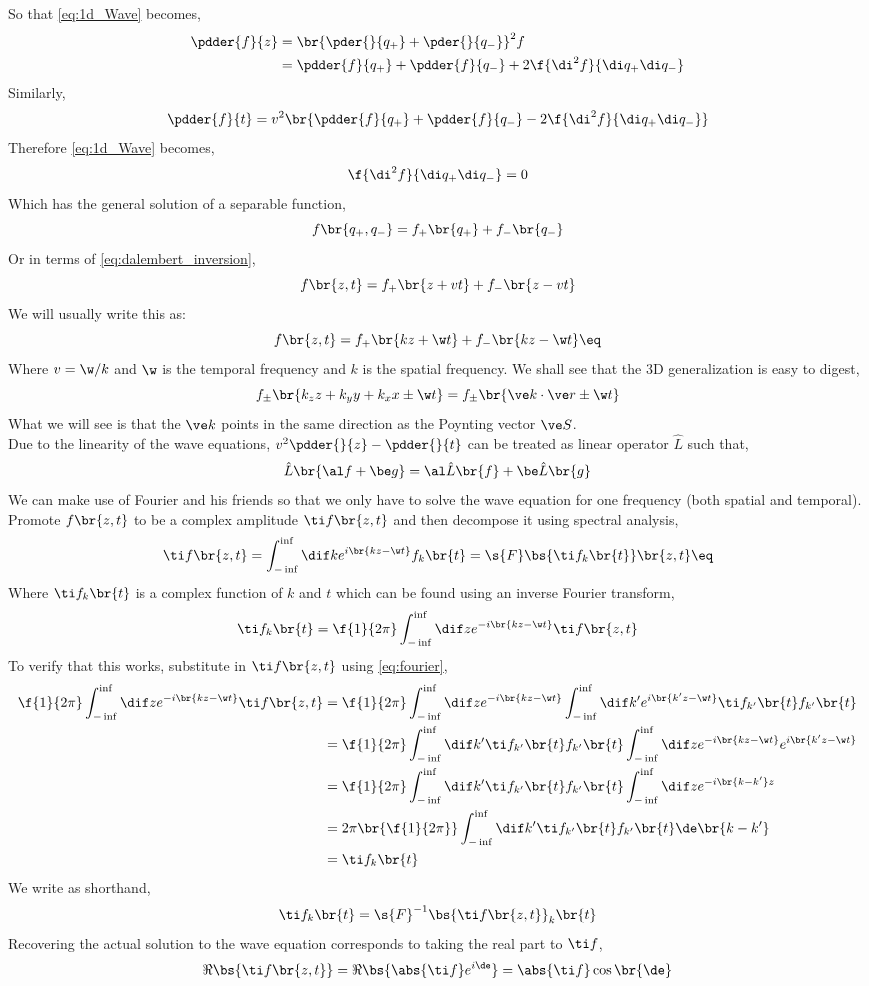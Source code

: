 \documentclass{article}
\begin{document}
So that \cref{eq:1d_Wave} becomes,
\begin{align*}
\pdder{f}{z}
&= \br{\pder{}{q_{+}} + \pder{}{q_{-}}}^2 f \\
&= \pdder{f}{q_{+}} + \pdder{f}{q_{-}} + 2 \f{\di^2 f}{\di q_{+} \di q_-}
\end{align*}
Similarly,
\[ \pdder{f}{t} = v^2\br{\pdder{f}{q_{+}} + \pdder{f}{q_{-}} - 2 \f{\di^2 f}{\di q_{+} \di q_-}} \]
Therefore \cref{eq:1d_Wave} becomes,
\[ \f{\di^2 f}{\di q_{+} \di q_-} = 0 \]
Which has the general solution of a separable function,
\[ f\br{q_+, q_-}= f_+\br{q_+} + f_-\br{q_-} \]
Or in terms of \cref{eq:dalembert_inversion},
\[ f\br{z, t}= f_+\br{z+vt} + f_-\br{z-vt} \]
We will usually write this as:
\[ f\br{z, t}= f_+\br{kz+\w t} + f_-\br{kz-\w t} \eq \label{eq:dalembert_solution} \]
Where $v = \w /k$ and $\w$ is the temporal frequency and $k$ is the spatial frequency. We shall see that the 3D generalization is easy to digest,
\[ f_{\pm}\br{k_z z + k_y y + k_x x \pm \w t} = f_{\pm}\br{\ve k \cdot \ve r \pm \w t} \]
What we will see is that the  $\ve k$ points in the same direction as the Poynting vector $\ve S$. \\

Due to the linearity of the wave equations, $v^2 \pdder{}{z} - \pdder{}{t}$ can be treated as linear operator $\hat L$ such that,
\[ \hat L \br{\al f + \be g} = \al \hat L \br{f} + \be \hat L \br{g} \]
We can make use of Fourier and his friends so that we only have to solve the wave equation for one frequency (both spatial and temporal). Promote $f\br{z,t}$ to be a complex amplitude $\ti f\br{z, t}$ and then decompose it using spectral analysis,
\[ \ti f\br{z,t} = \int_{-\inf}^{\inf} \dif k e^{i \br{kz - \w t}} f_{k} \br{t} = \s{F}\bs{ \ti f_{k} \br{t}}\br{z,t} \eq \label{eq:fourier}\]
Where $\ti f_{k} \br{t}$ is a complex function of $k$ and $t$ which can be found using an inverse Fourier transform,
\[ \ti f_{k} \br{t} = \f{1}{2\pi}\int_{-\inf}^{\inf} \dif z e^{-i \br{k z - \w t} }\ti f\br{z,t}  \]
To verify that this works, substitute in $\ti f\br{z,t}$ using \cref{eq:fourier},
\begin{align*}
    \f{1}{2\pi} \int_{-\inf}^{\inf} \dif z e^{-i \br{k z - \w t} }\ti f\br{z,t}
    &= \f{1}{2\pi}\int_{-\inf}^{\inf} \dif z e^{-i \br{k z - \w t} }\int_{-\inf}^{\inf} \dif k' e^{i \br{k'z - \w t}} \ti f_{k'} \br{t}f_{k'} \br{t} \\
    &= \f{1}{2\pi}\int_{-\inf}^{\inf} \dif k'  \ti f_{k'} \br{t}f_{k'} \br{t} \int_{-\inf}^{\inf} \dif z e^{-i \br{k z - \w t} } e^{i \br{k'z - \w t}} \\
    &= \f{1}{2\pi}\int_{-\inf}^{\inf} \dif k'  \ti f_{k'} \br{t}f_{k'} \br{t} \int_{-\inf}^{\inf} \dif z e^{-i\br{k - k'} z} \\
    &= 2 \pi \br{\f{1}{2\pi}} \int_{-\inf}^{\inf} \dif k'  \ti f_{k'} \br{t}f_{k'} \br{t} \de\br{k - k'} \\
    &= \ti f_{k} \br{t}
\end{align*}
We write as shorthand,
\[ \ti f_k \br{t} = \s{F}^{-1}\bs{\ti f\br{z,t}}_k \br{t} \]
Recovering the actual solution to the wave equation corresponds to taking the real part to $\ti f$,
\[ \Re \bs{\ti f \br{z, t}} = \Re \bs{\abs{\ti f}e^{i \de}} = \abs{\ti f}\cos\br{\de} \]
\end{document}
